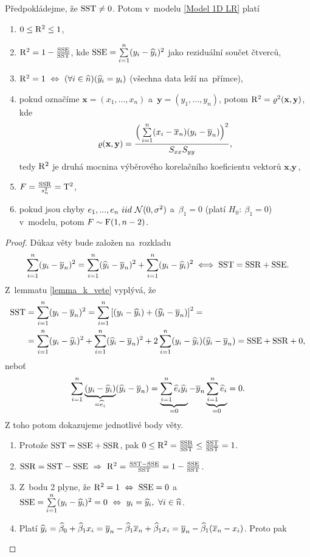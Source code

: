 \begin{theorem}\label{vetasbysxx}
	Předpokládejme, že $\mathrm{SST}\neq 0$. Potom v~modelu \eqref{Model 1D LR} platí\begin{enumerate}
		\item $0\leq \mathrm{R}^2\leq1$,
		\item $\mathrm{R}^2 = 1-\frac{\mathrm{SSE}}{\mathrm{SST}}$, kde $\mathrm{SSE} = \sum\limits_{i=1}^{n} (y_i-\widehat{y}_i)^2$ jako reziduální součet čtverců,
		\item $\mathrm{R}^2 = 1~\Leftrightarrow~(\forall i\in\widehat{n})(\widehat{y}_i = y_i)$ (všechna data leží na~přímce),
		\item pokud označíme $\textbf{x} = (x_1,...,x_n)$ a~$\textbf{y} = (y_1,...,y_n)$, potom $\mathrm{R}^2 = \varrho^2(\textbf{x},\textbf{y})$, kde $$ \varrho(\textbf{x},\textbf{y}) = \frac{ \Big( \sum\limits_{i=1}^{n} (x_i-\overline{x}_n)(y_i-\overline{y}_n) \Big)^2}{S_{xx} S_{yy}}, $$ tedy $\mathrm{R}^2$ je druhá mocnina výběrového korelačního koeficientu vektorů $\textbf{x},\textbf{y}$,
		\item $F = \frac{\mathrm{SSR}}{s_n^2} = \mathrm{T}^2$,
		\item pokud jsou chyby $e_1,...,e_n~iid~\mathcal{N}(0,\sigma^2)$ a~$\beta_1 = 0$ (platí $H_0:~\beta_1 = 0$) v~modelu, potom $F\sim\mathrm{F}(1,n-2)$.
	\end{enumerate}
\begin{proof}
	Důkaz věty bude založen na~rozkladu
	 $$ \sum\limits_{i=1}^{n} (y_i-\overline{y}_n)^2  = \sum\limits_{i=1}^{n} (\widehat{y}_i-\overline{y}_n)^2 + \sum\limits_{i=1}^{n} (y_i-\widehat{y}_i)^2 \iff \mathrm{SST} = \mathrm{SSR}+\mathrm{SSE}.$$
	 Z~lemmatu \ref{lemma_k_vete} vyplývá, že
	\[
	\begin{split}
	\mathrm{SST}& = \sum\limits_{i=1}^{n} (y_i-\overline{y}_n)^2 = \sum\limits_{i=1}^{n} \left[(y_i-\widehat{y}_i)+(\widehat{y}_i-\overline{y}_n) \right]^2 = \\& = \sum\limits_{i=1}^{n} (y_i-\widehat{y}_i)^2+\sum\limits_{i=1}^{n} (\widehat{y}_i-\overline{y}_n)^2+2\sum\limits_{i=1}^{n} (y_i-\widehat{y}_i)(\widehat{y}_i-\overline{y}_n) = \mathrm{SSE}+\mathrm{SSR}+0,
	\end{split}
	\]
	neboť $$ \sum\limits_{i=1}^{n} \underbrace{(y_i-\widehat{y}_i)}_{ = \widehat{e}_i}(\widehat{y}_i-\overline{y}_n) = \underbrace{\sum\limits_{i=1}^{n} \widehat{e}_i\widehat{y}_i}_{ = 0}-\overline{y}_n\underbrace{\sum\limits_{i=1}^{n} \widehat{e}_i}_{ = 0} = 0. $$
	Z toho potom dokazujeme jednotlivé body věty. \begin{enumerate}
		\item Protože $\mathrm{SST} = \mathrm{SSE}+\mathrm{SSR}$, pak $0\leq \mathrm{R}^2 = \frac{\mathrm{SSR}}{\mathrm{SST}}\leq \frac{\mathrm{SST}}{\mathrm{SST}} = 1$.
		\item $\mathrm{SSR} = \mathrm{SST}-\mathrm{SSE}~\Rightarrow~\mathrm{R}^2 = \frac{\mathrm{SST}-\mathrm{SSE}}{\mathrm{SST}} = 1-\frac{\mathrm{SSE}}{\mathrm{SST}}$.
		\item Z~bodu 2 plyne, že $\mathrm{R}^2 = 1~\Leftrightarrow~\mathrm{SSE} = 0$ a~$\mathrm{SSE} = \sum\limits_{i=1}^{n} (y_i-\widehat{y}_i)^2 = 0~\Leftrightarrow~y_i = \widehat{y}_i, ~\forall i\in\widehat{n}$.
		\item Platí $\widehat{y}_i = \widehat{\beta}_0 + \widehat{\beta}_1 x_i = \overline{y}_n-\widehat{\beta}_1 \overline{x}_n + \widehat{\beta}_1 x_i = \overline{y}_n-\widehat{\beta}_1(\overline{x}_n-x_i)$. Proto pak

\end{enumerate}
\end{proof}
\end{theorem}
